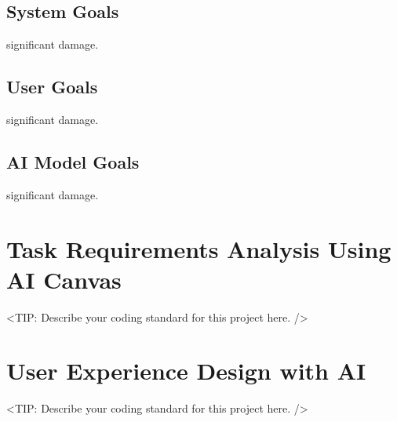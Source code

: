 \begin{table}[h]\caption{Organizational Goals of KU Parking}
    \label{tab:organization-goal}
    \centering
\end{table}

\subsection{System Goals}
\label{subsection:system-goal}
significant damage.

\subsection{User Goals}
\label{subsection:user-goal}
significant damage.

\subsection{AI Model Goals}
\label{subsection:ai-model-goal}
significant damage.

\section{Task Requirements Analysis Using AI Canvas}
\label{section:task-requirement-analysis-using-ai-canvas}
<TIP: Describe your coding standard for this project here. />


\section{User Experience Design with AI}
\label{section:user-experience-with-ai}
<TIP: Describe your coding standard for this project here. />

